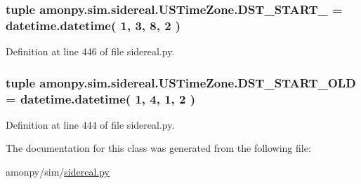 \hypertarget{classamonpy_1_1sim_1_1sidereal_1_1_u_s_time_zone_aa40ce77d299e1e3539f146b415383614}{
\subsubsection[{D\-S\-T\-\_\-\-S\-T\-A\-R\-T\-\_\-2007}]{\setlength{\rightskip}{0pt plus 5cm}tuple amonpy.\-sim.\-sidereal.\-U\-S\-Time\-Zone.\-D\-S\-T\-\_\-\-S\-T\-A\-R\-T\-\_ = datetime.\-datetime( 1, 3, 8, 2 )\hspace{0.3cm}{\ttfamily [static]}}}\label{classamonpy_1_1sim_1_1sidereal_1_1_u_s_time_zone_aa40ce77d299e1e3539f146b415383614}


Definition at line 446 of file sidereal.\-py.

\hypertarget{classamonpy_1_1sim_1_1sidereal_1_1_u_s_time_zone_afea8d961d34e0b6a75bdad0f9ac41b34}{
\subsubsection[{D\-S\-T\-\_\-\-S\-T\-A\-R\-T\-\_\-\-O\-L\-D}]{\setlength{\rightskip}{0pt plus 5cm}tuple amonpy.\-sim.\-sidereal.\-U\-S\-Time\-Zone.\-D\-S\-T\-\_\-\-S\-T\-A\-R\-T\-\_\-\-O\-L\-D = datetime.\-datetime( 1, 4, 1, 2 )\hspace{0.3cm}{\ttfamily [static]}}}\label{classamonpy_1_1sim_1_1sidereal_1_1_u_s_time_zone_afea8d961d34e0b6a75bdad0f9ac41b34}


Definition at line 444 of file sidereal.\-py.



The documentation for this class was generated from the following file\-:\begin{DoxyCompactItemize}
\item 
amonpy/sim/\hyperlink{sidereal_8py}{sidereal.\-py}\end{DoxyCompactItemize}
